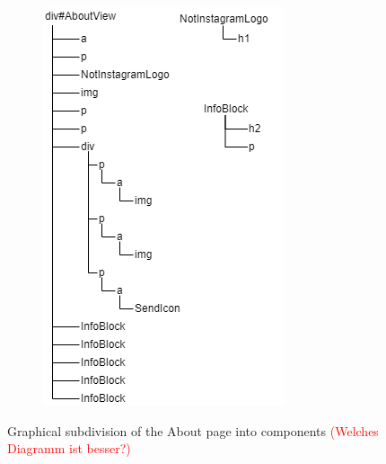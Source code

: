 \documentclass[a4paper, 12pt]{article}
\begin{document}
\begin{figure}
\begin{center}
\begin{subfigure}{0.49\linewidth}
\begin{center}
      \end{center}
    \end{subfigure}
    \begin{subfigure}{0.49\linewidth}
      \begin{center}
        \includegraphics[width=\linewidth, keepaspectratio]{diagrams/about-dom-2.png}
      \end{center}
    \end{subfigure}
  \end{center}
  \caption{Graphical subdivision of the About page into components \textcolor{red}{(Welches Diagramm ist besser?)}}\label{fig:graphicalAboutPage}
\end{figure}
\end{document}

